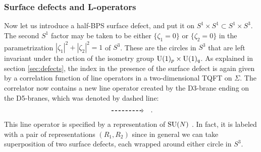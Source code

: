 \begin{comment}
Here we first review the computation for the surface
defect labeled with the fundamental representation of $\SU(2)$ based
on the method developed in \cite{Gaiotto:2012xa}, and show that the result agrees
with the prediction from the transfer matrix \eqref{eq:proposal}.
\end{comment}





\subsubsection{Surface defects and L-operators}

Now let us introduce a half-BPS surface defect, and put it on $S^{1} \times S^{1} \subset S^1 \times S^3$.
The second $S^{1}$ factor may be taken to be either $\{\zeta_{1}=0\}$
or $\{\zeta_{2}=0\}$ in the parametrization $|\zeta_{1}|^{2}+|\zeta_{2}|^{2}=1$
of $S^{3}$. These are the circles in $S^{3}$ that are left invariant
under the action of the isometry group $\mathrm{U}(1)_{p} \times \mathrm{U}(1)_{q}$.
As explained in section \ref{sec:defects}, the index in the presence of the surface
defect is again given by a correlation function of line operators
in a two-dimensional TQFT on $\Sigma$. The correlator now contains a new line
operator created by the D3-brane ending on the D5-branes, which was
denoted by dashed line:
\begin{equation}
    \begin{tikzpicture}[scale=1, baseline=(x.base)]    \node (x) at (0,0) {\vphantom{x}};

        \draw[thick, densely dashed, ->] (0,0) -- (1.6,0);

    \end{tikzpicture}
  \quad .
\end{equation}
This line operator is specified by a representation of $\mathrm{SU}(N)$
\cite{Gukov:2006jk,Gukov:2008sn,Gadde:2013dda}.
In fact, it is labeled with a pair of representations
$(R_{1},R_{2})$ since in general we can take superposition of two
surface defects, each wrapped around either circle in $S^{3}$.


